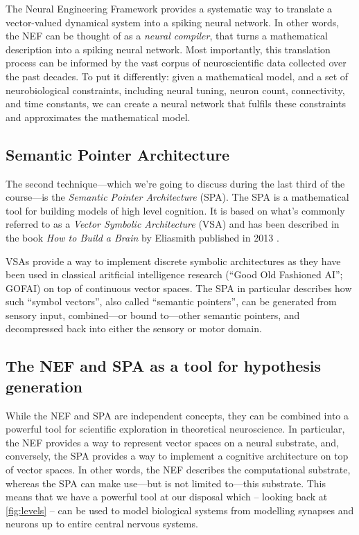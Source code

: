 \documentclass[10pt,letterpaper,oneside]{article}
\begin{document}
The Neural Engineering Framework provides a systematic way to translate a vector-valued dynamical system into a spiking neural network. In other words, the NEF can be thought of as a \emph{neural compiler}, that turns a mathematical description into a spiking neural network. Most importantly, this translation process can be informed by the vast corpus of neuroscientific data collected over the past decades. To put it differently: given a mathematical model, and a set of neurobiological constraints, including neural tuning, neuron count, connectivity, and time constants, we can create a neural network that fulfils these constraints and approximates the mathematical model.

\subsection{Semantic Pointer Architecture}
The second technique---which we're going to discuss during the last third of the course---is the \emph{Semantic Pointer Architecture} (SPA). The SPA is a mathematical tool for building models of high level cognition. It is based on what's commonly referred to as a \emph{Vector Symbolic Architecture} (VSA) and has been described in the book \emph{How to Build a Brain} by Eliasmith published in 2013 \cite{eliasmith2013how}.

VSAs provide a way to implement discrete symbolic architectures as they have been used in classical aritficial intelligence research (\enquote{Good Old Fashioned AI}; GOFAI) on top of continuous vector spaces. The SPA in particular describes how such \enquote{symbol vectors}, also called \enquote{semantic pointers}, can be generated from sensory input, combined---or bound to---other semantic pointers, and decompressed back into either the sensory or motor domain.

\subsection{The NEF and SPA as a tool for hypothesis generation}
While the NEF and SPA are independent concepts, they can be combined into a powerful tool for scientific exploration in theoretical neuroscience. In particular, the NEF provides a way to represent vector spaces on a neural substrate, and, conversely, the SPA provides a way to implement a cognitive architecture on top of vector spaces. In other words, the NEF describes the computational substrate, whereas the SPA can make use---but is not limited to---this substrate. This means that we have a powerful tool at our disposal which -- looking back at \cref{fig:levels} -- can be used to model biological systems from modelling synapses and neurons up to entire central nervous systems.
\end{document}
